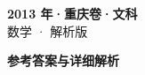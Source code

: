 \documentclass[zihao=-4, a4paper]{ctexart}
\begin{document}
\begin{center}
  {\Large\bfseries 2013 年·重庆卷·文科}\\[4pt]
  {\large 数学 · 解析版}
\end{center}
\medskip
{}

\clearpage
{}
\begin{center}{\Large\bfseries 参考答案与详细解析}\end{center}
\medskip

\end{document}
